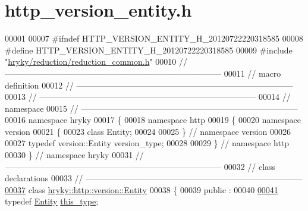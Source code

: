 \hypertarget{http__version__entity_8h_source}{\section{http\-\_\-version\-\_\-entity.\-h}
}

\begin{DoxyCode}
00001 
00007 \textcolor{preprocessor}{#ifndef HTTP\_VERSION\_ENTITY\_H\_20120722220318585}
00008 \textcolor{preprocessor}{}\textcolor{preprocessor}{#define HTTP\_VERSION\_ENTITY\_H\_20120722220318585}
00009 \textcolor{preprocessor}{}\textcolor{preprocessor}{#include "\hyperlink{reduction__common_8h}{hryky/reduction/reduction_common.h}"}
00010 \textcolor{comment}{//
      ------------------------------------------------------------------------------}
00011 \textcolor{comment}{// macro definition}
00012 \textcolor{comment}{//
      ------------------------------------------------------------------------------}
00013 \textcolor{comment}{//
      ------------------------------------------------------------------------------}
00014 \textcolor{comment}{// namespace}
00015 \textcolor{comment}{//
      ------------------------------------------------------------------------------}
00016 \textcolor{keyword}{namespace }hryky
00017 \{
00018 \textcolor{keyword}{namespace }http
00019 \{
00020 \textcolor{keyword}{namespace }version
00021 \{
00023     \textcolor{keyword}{class }Entity;
00024 
00025 \} \textcolor{comment}{// namespace version}
00026 
00027 \textcolor{keyword}{typedef} version::Entity version\_type;
00028 
00029 \} \textcolor{comment}{// namespace http}
00030 \} \textcolor{comment}{// namespace hryky}
00031 \textcolor{comment}{//
      ------------------------------------------------------------------------------}
00032 \textcolor{comment}{// class declarations}
00033 \textcolor{comment}{//
      ------------------------------------------------------------------------------}
\hypertarget{http__version__entity_8h_source_l00037}{}\hyperlink{classhryky_1_1http_1_1version_1_1_entity}{00037} \textcolor{comment}{}\textcolor{keyword}{class }\hyperlink{classhryky_1_1http_1_1version_1_1_entity}{hryky::http::version::Entity}
00038 \{
00039 \textcolor{keyword}{public} :
00040 
\hypertarget{http__version__entity_8h_source_l00041}{}\hyperlink{classhryky_1_1http_1_1version_1_1_entity_af34c475a16e87fc57803edeec44959de}{00041}     \textcolor{keyword}{typedef} \hyperlink{classhryky_1_1http_1_1version_1_1_entity}{Entity}                      \hyperlink{classhryky_1_1http_1_1version_1_1_entity_af34c475a16e87fc57803edeec44959de}{this_type};

\end{DoxyCode}
